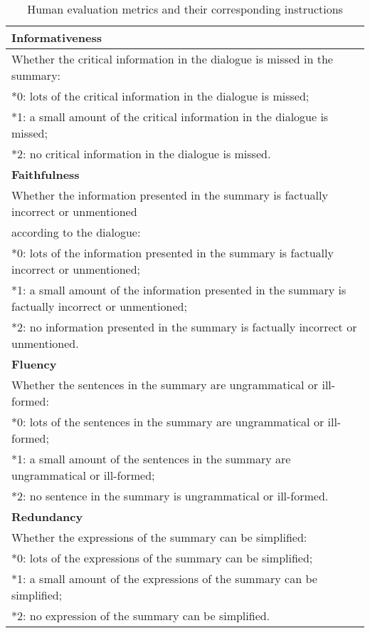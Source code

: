 \begin{table*}[]
\centering
\begin{tabular}{l}
\hline
\textbf{Informativeness}\\ \hline
Whether the critical information in the dialogue is missed in the summary: \\
*0: lots of the critical information in the dialogue is missed; \\
*1: a small amount of the critical information in the dialogue is missed;\\
*2: no critical information in the dialogue is missed.\\
\hline
\textbf{Faithfulness}\\ \hline
Whether the information presented in the summary is factually incorrect or unmentioned \\
according to the dialogue: \\
*0: lots of the information presented in the summary is factually incorrect or unmentioned; \\
*1: a small amount of the information presented in the summary is factually incorrect or unmentioned;\\
*2: no information presented in the summary is factually incorrect or unmentioned.\\
\hline
\textbf{Fluency}\\ \hline
Whether the sentences in the summary are ungrammatical or ill-formed: \\
*0: lots of the sentences in the summary are ungrammatical or ill-formed; \\
*1: a small amount of the sentences in the summary are ungrammatical or ill-formed;\\
*2: no sentence in the summary is ungrammatical or ill-formed.\\
\hline
\textbf{Redundancy}\\ \hline
 Whether the expressions of the summary can be simplified: \\
*0: lots of the expressions of the summary can be simplified; \\
*1: a small amount of the expressions of the summary can be simplified;\\
*2: no expression of the summary can be simplified.\\
\hline
\end{tabular}
\caption{Human evaluation metrics and their corresponding instructions}
\label{tab:human_eval_instruct}
\end{table*}


